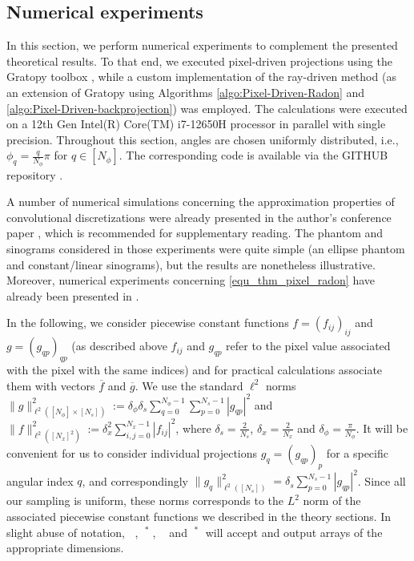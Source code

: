\documentclass[11pt,reqno]{amsart}
\DeclareMathOperator{\RayRadon}{\mathcal{R}^\mathrm{rd}_{\delta}}
\DeclareMathOperator{\PixelRadon}{\mathcal{R}^\mathrm{pd}_{\delta}}
\numberwithin{theorem}{section}
\theoremstyle{remark}
\begin{document}
\subsection{Numerical experiments}

In this section, we perform numerical experiments to complement the presented
theoretical results. To that end, we executed pixel-driven projections using the
Gratopy toolbox \cite{kristian_bredies_2021_5221443}, 
while a custom implementation of the ray-driven method (as
an extension of Gratopy using Algorithms \ref{algo:Pixel-Driven-Radon} and \ref{algo:Pixel-Driven-backprojection}) was employed. The calculations were executed on a 12th Gen Intel(R)
Core(TM) i7-12650H processor in parallel with single precision. Throughout this
section, angles are chosen uniformly distributed, i.e., $\phi_q =  \frac{q}{N_\phi }\pi$ for $q \in [N_\phi]$. 
The
corresponding code is available via the GITHUB repository \cite{Huber_Github_2025_Simulations_Simulations_Convergence_Ray_Pixel_Driven_Strong_Topology}.

A number of numerical simulations concerning the approximation properties of convolutional discretizations were already presented in the author's conference paper \cite[Section 4]{10.1007/978-3-031-92366-1_11}, which is recommended for supplementary reading. The phantom and sinograms considered in those experiments were quite simple (an ellipse phantom and constant/linear sinograms), but the results are nonetheless illustrative.
Moreover, numerical experiments concerning \ref{equ_thm_pixel_radon} have already been presented in \cite{doi:10.1137/20M1326635}.

In the following, we consider piecewise constant functions $f=(f_{ij})_{ij}$ and $g=(g_{qp})_{qp}$ (as described above $f_{ij}$ and $g_{qp}$ refer to the pixel value associated with the pixel with the same indices) and for practical calculations associate them with vectors $\overline f$ and $\overline g$. 
We use the standard $\ell^2$ norms $\|g\|_{\ell^2([N_\phi]\times[N_s])}^2:= \delta_\phi \delta_s\sum_{q=0}^{N_\phi-1}\sum_{p=0}^{N_s-1} |g_{qp}|^2$ and $\|f\|_{\ell^2([N_x]^2)}^2:= \delta_x^2\sum_{i,j=0}^{N_x-1} |f_{ij}|^2$, where $\delta_s=\frac{2}{N_s}$, $\delta_x =\frac{2}{N_x}$ and $\delta_\phi = \frac{\pi}{N_\phi}$. It will be convenient for us to consider individual projections $g_q= (g_{qp})_p$ for a specific angular index $q$, and correspondingly $\|g_q\|_{\ell^2([N_s])}^2=\delta_s\sum_{p=0}^{N_s-1}|g_{qp}|^2$.
 Since all our sampling is uniform, these norms corresponds to the $L^2$ norm of the associated piecewise constant functions we described in the theory sections. In slight abuse of notation, $\RayRadon$, $\RayRadon^*$, $\PixelRadon$ and $\PixelRadon^*$ will accept and output arrays of the appropriate dimensions.
\end{document}
